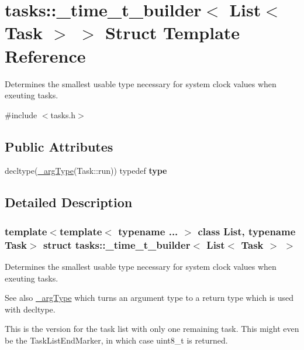 \hypertarget{structtasks_1_1__time__t__builder_3_01List_3_01Task_01_4_01_4}{}\section{tasks\+:\+:\+\_\+time\+\_\+t\+\_\+builder$<$ List$<$ Task $>$ $>$ Struct Template Reference}
\label{structtasks_1_1__time__t__builder_3_01List_3_01Task_01_4_01_4}


Determines the smallest usable type necessary for system clock values when exeuting tasks.  




{\ttfamily \#include $<$tasks.\+h$>$}

\subsection*{Public Attributes}
\begin{DoxyCompactItemize}
\item 
\hypertarget{structtasks_1_1__time__t__builder_3_01List_3_01Task_01_4_01_4_a44b42b3031919ebd3391baef9614527d}{}\label{structtasks_1_1__time__t__builder_3_01List_3_01Task_01_4_01_4_a44b42b3031919ebd3391baef9614527d} 
decltype(\hyperlink{namespacetasks_ac4a797a86584958bef0b67616a38c8ae}{\+\_\+arg\+Type}(Task\+::run)) typedef {\bfseries type}
\end{DoxyCompactItemize}


\subsection{Detailed Description}
\subsubsection*{template$<$template$<$ typename ... $>$ class List, typename Task$>$\newline
struct tasks\+::\+\_\+time\+\_\+t\+\_\+builder$<$ List$<$ Task $>$ $>$}

Determines the smallest usable type necessary for system clock values when exeuting tasks. 

\begin{DoxySeeAlso}{See also}
\hyperlink{namespacetasks_ac4a797a86584958bef0b67616a38c8ae}{\+\_\+arg\+Type} which turns an argument type to a return type which is used with decltype.
\end{DoxySeeAlso}
This is the version for the task list with only one remaining task. This might even be the Task\+List\+End\+Marker, in which case uint8\+\_\+t is returned.


